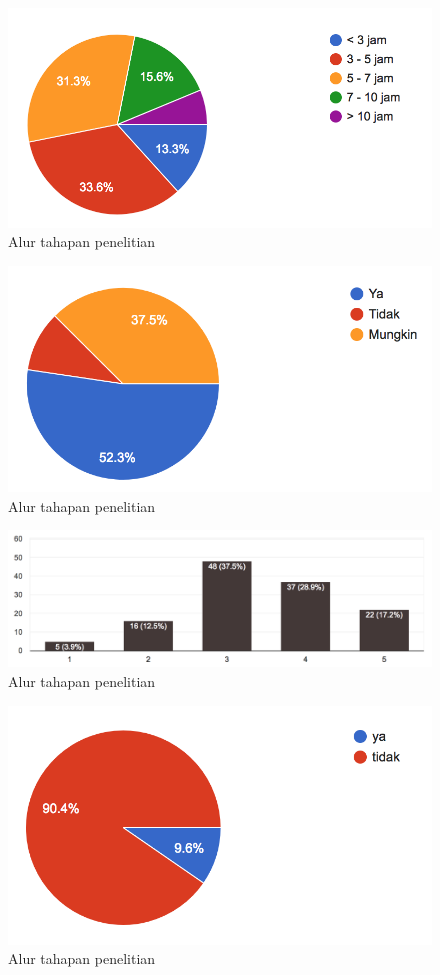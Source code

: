 \begin{figure}
	\includegraphics[width=\linewidth]{pics/lama-belajar}
	\caption{Alur tahapan penelitian}
	\centering
\end{figure}
\begin{figure}
	\includegraphics[width=\linewidth]{pics/lebih-senang-bermain-game}
	\caption{Alur tahapan penelitian}
	\centering
\end{figure}
\begin{figure}
	\includegraphics[width=\linewidth]{pics/menggali-lebih-dalam-sendiri}
	\caption{Alur tahapan penelitian}
	\centering
\end{figure}
\begin{figure}
	\includegraphics[width=\linewidth]{pics/mengulang-ddp}
	\caption{Alur tahapan penelitian}
	\centering
\end{figure}
